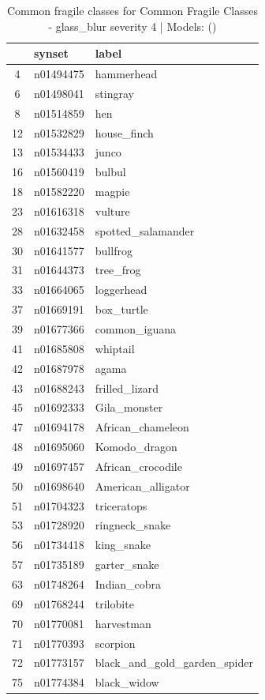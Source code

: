 \begin{table}
\caption{Common fragile classes for Common Fragile Classes - glass_blur severity 4 | Models: ()}
\label{tab:Common Fragile Classes - glass_blur severity 4_d41d8cd9}
\begin{tabular}{cll}
\toprule
 & synset & label \\
\midrule
4 & n01494475 & hammerhead \\
6 & n01498041 & stingray \\
8 & n01514859 & hen \\
12 & n01532829 & house_finch \\
13 & n01534433 & junco \\
16 & n01560419 & bulbul \\
18 & n01582220 & magpie \\
23 & n01616318 & vulture \\
28 & n01632458 & spotted_salamander \\
30 & n01641577 & bullfrog \\
31 & n01644373 & tree_frog \\
33 & n01664065 & loggerhead \\
37 & n01669191 & box_turtle \\
39 & n01677366 & common_iguana \\
41 & n01685808 & whiptail \\
42 & n01687978 & agama \\
43 & n01688243 & frilled_lizard \\
45 & n01692333 & Gila_monster \\
47 & n01694178 & African_chameleon \\
48 & n01695060 & Komodo_dragon \\
49 & n01697457 & African_crocodile \\
50 & n01698640 & American_alligator \\
51 & n01704323 & triceratops \\
53 & n01728920 & ringneck_snake \\
56 & n01734418 & king_snake \\
57 & n01735189 & garter_snake \\
63 & n01748264 & Indian_cobra \\
69 & n01768244 & trilobite \\
70 & n01770081 & harvestman \\
71 & n01770393 & scorpion \\
72 & n01773157 & black_and_gold_garden_spider \\
75 & n01774384 & black_widow \\

\end{tabular}
\end{table}
